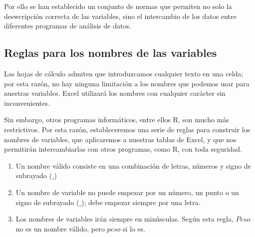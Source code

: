 \documentclass[
  letterpaper,
]{scrbook}
\providecommand{\tightlist}{%
  \setlength{\itemsep}{0pt}\setlength{\parskip}{0pt}}\usepackage{longtable,booktabs,array}
\begin{document}
Por ello se han establecido un conjunto de normas que permiten no solo
la deswcripción correcta de las variables, sino el intercambio de los
datos entre diferentes programas de análisis de datos.

\hypertarget{reglas-para-los-nombres-de-las-variables}{%
\subsection{Reglas para los nombres de las
variables}\label{reglas-para-los-nombres-de-las-variables}}

Las hojas de cálculo admiten que introduzcamos cualquier texto en una
celda; por esta razón, no hay ninguna limitación a los nombres que
podemos usar para nuestras variables. Excel utilizará los nombres con
cualquier carácter sin inconvenientes.

Sin embargo, otros programas informáticos, entre ellos R, son mucho más
restrictivos. Por esta razón, estableceremos una serie de reglas para
construir los nombres de variables, que aplicaremos a nuestras tablas de
Excel, y que nos permitirán intercambiarlas con otros programas, como R,
con toda seguridad.

\begin{enumerate}
\def\labelenumi{\arabic{enumi}.}
\tightlist
\item
  Un nombre válido consiste en una combinación de letras, números y
  signo de subrayado (\(\_\))
\item
  Un nombre de variable no puede empezar por un número, un punto o un
  signo de subrayado (\(\_\)); debe empezar siempre por una letra.
\item
  Los nombres de variables irán siempre en minúsculas. Según esta regla,
  \(Peso\) no es un nombre válido, pero \(peso\) si lo es.
\end{enumerate}

{}
\end{document}
